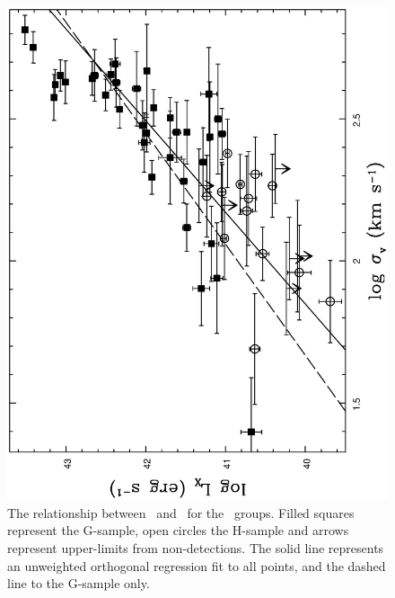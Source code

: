 \documentclass[usenatbib]{mn2e}
\begin{document}
\begin{figure}
\begin{minipage}{241pt}
    \includegraphics[height=\linewidth,angle=270]{fig_14.ps}
    \caption{The relationship between \LX\ and \sigmav\ for the \GEMS\ groups.
             Filled squares represent the G-sample, open circles the H-sample
             and arrows represent upper-limits from non-detections.  The solid
             line represents an unweighted orthogonal regression fit to all
             points, and the dashed line to the G-sample only.} 
    \label{fig_LX_sigma}

  \end{minipage}\hspace{18pt}
  \begin{minipage}{241pt}


\end{minipage}
\end{figure}
\end{document}

